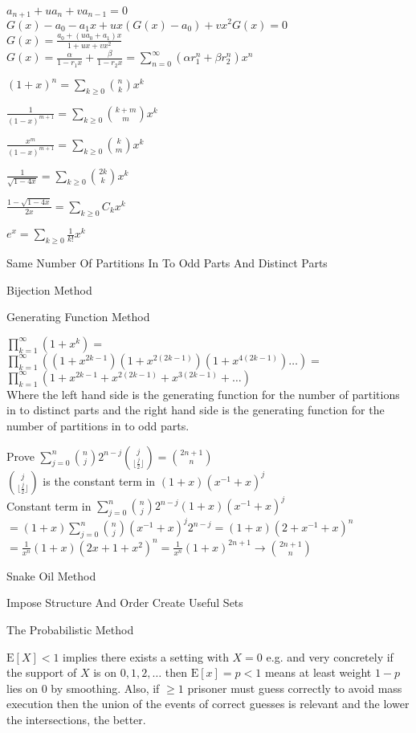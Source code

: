 $a_{n+1}+ua_n+va_{n-1}=0$ \\
$G(x)-a_0-a_1 x+ux(G(x)-a_0)+vx^2G(x)=0$ \\
$G(x)=\frac{a_0+(ua_0+a_1)x}{1+ux+vx^2}$ \\
$G(x)=\frac{\alpha}{1-r_1 x}+\frac{\beta}{1-r_2 x}=\sum_{n=0}^{\infty} (\alpha r_1^n + \beta r_2^n)x^n$

$(1+x)^n = \sum_{k \ge 0} \binom{n}{k} x^k$

$\frac{1}{(1-x)^{m+1}} = \sum_{k \ge 0} \binom{k+m}{m} x^k$

$\frac{x^m}{(1-x)^{m+1}} = \sum_{k \ge 0} \binom{k}{m} x^k$

$\frac{1}{\sqrt{1-4x}} = \sum_{k \ge 0} \binom{2k}{k} x^k$

$\frac{1-\sqrt{1-4x}}{2x} = \sum_{k \ge 0} C_k x^k$

$e^x = \sum_{k \ge 0} \frac{1}{k!} x^k$

Same Number Of Partitions In To Odd Parts And Distinct Parts

Bijection Method

Generating Function Method

$\prod_{k=1}^{\infty} (1+x^k)=$ \\
$\prod_{k=1}^{\infty} ((1+x^{2k-1})(1+x^{2(2k-1)})(1+x^{4(2k-1)})\dots)=$ \\
$\prod_{k=1}^{\infty} (1+x^{2k-1}+x^{2(2k-1)}+x^{3(2k-1)}+\dots)$ \\ Where the left hand side is the generating function for the number of partitions in to distinct parts and the right hand side is the generating function for the number of partitions in to odd parts.

Prove $\sum_{j=0}^n \binom{n}{j}2^{n-j}\binom{j}{\lfloor \frac{j}{2} \rfloor} = \binom{2n+1}{n}$ \\
$\binom{j}{\lfloor \frac{j}{2} \rfloor}$ is the constant term in $(1+x)(x^{-1}+x)^j$ \\
Constant term in $\sum_{j=0}^n \binom{n}{j}2^{n-j}(1+x)(x^{-1}+x)^j$ \\
$= (1+x)\sum_{j=0}^n \binom{n}{j}(x^{-1}+x)^j 2^{n-j} = (1+x)(2+x^{-1}+x)^n$ \\
$= \frac{1}{x^n} (1+x)(2x+1+x^2)^n = \frac{1}{x^n} (1+x)^{2n+1} \to \binom{2n+1}{n}$

Snake Oil Method

Impose Structure And Order Create Useful Sets

The Probabilistic Method

$\text{E}[X]<1$ implies there exists a setting with $X=0$ e.g. and very concretely if the support of $X$ is on $0,1,2,\dots$ then $\text{E}[x]=p<1$ means at least weight $1-p$ lies on $0$ by smoothing. Also, if $\ge 1$ prisoner must guess correctly to avoid mass execution then the union of the events of correct guesses is relevant and the lower the intersections, the better.

